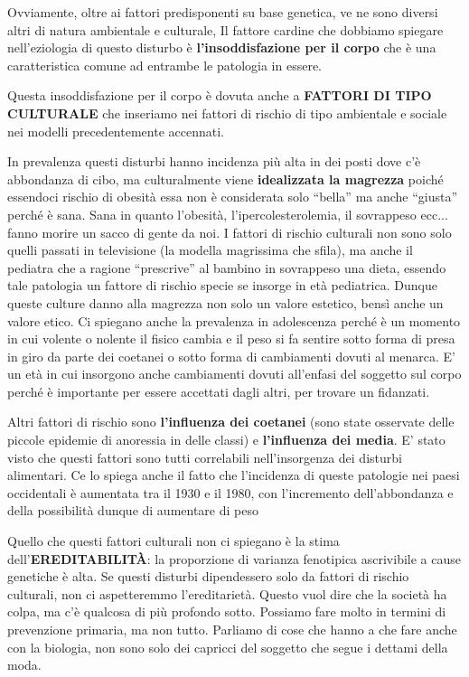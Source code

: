 Ovviamente, oltre ai fattori predisponenti su base genetica, ve ne sono
diversi altri di natura ambientale e culturale, Il fattore cardine che
dobbiamo spiegare nell'eziologia di questo disturbo è
\textbf{l'insoddisfazione per il corpo} che è una caratteristica comune
ad entrambe le patologia in essere.

Questa insoddisfazione per il corpo è dovuta anche a \textbf{FATTORI DI
TIPO CULTURALE} che inseriamo nei fattori di rischio di tipo ambientale
e sociale nei modelli precedentemente accennati.

In prevalenza questi disturbi hanno incidenza più alta in dei posti dove
c'è abbondanza di cibo, ma culturalmente viene \textbf{idealizzata la
magrezza} poiché essendoci rischio di obesità essa non è considerata
solo ``bella'' ma anche ``giusta'' perché è sana. Sana in quanto
l'obesità, l'ipercolesterolemia, il sovrappeso ecc... fanno morire un
sacco di gente da noi. I fattori di rischio culturali non sono solo
quelli passati in televisione (la modella magrissima che sfila), ma
anche il pediatra che a ragione ``prescrive'' al bambino in sovrappeso
una dieta, essendo tale patologia un fattore di rischio specie se
insorge in età pediatrica. Dunque queste culture danno alla magrezza non
solo un valore estetico, bensì anche un valore etico. Ci spiegano anche
la prevalenza in adolescenza perché è un momento in cui volente o
nolente il fisico cambia e il peso si fa sentire sotto forma di presa in
giro da parte dei coetanei o sotto forma di cambiamenti dovuti al
menarca. E' un età in cui insorgono anche cambiamenti dovuti all'enfasi
del soggetto sul corpo perché è importante per essere accettati dagli
altri, per trovare un fidanzati.

Altri fattori di rischio sono \textbf{l'influenza dei coetanei} (sono
state osservate delle piccole epidemie di anoressia in delle classi) e
\textbf{l'influenza dei media}. E' stato visto che questi fattori sono
tutti correlabili nell'insorgenza dei disturbi alimentari. Ce lo spiega
anche il fatto che l'incidenza di queste patologie nei paesi occidentali
è aumentata tra il 1930 e il 1980, con l'incremento dell'abbondanza e
della possibilità dunque di aumentare di peso

Quello che questi fattori culturali non ci spiegano è la stima
dell'\textbf{EREDITABILITÀ}: la proporzione di varianza fenotipica
ascrivibile a cause genetiche è alta. Se questi disturbi dipendessero
solo da fattori di rischio culturali, non ci aspetteremmo
l'ereditarietà. Questo vuol dire che la società ha colpa, ma c'è
qualcosa di più profondo sotto. Possiamo fare molto in termini di
prevenzione primaria, ma non tutto. Parliamo di cose che hanno a che
fare anche con la biologia, non sono solo dei capricci del soggetto che
segue i dettami della moda.

